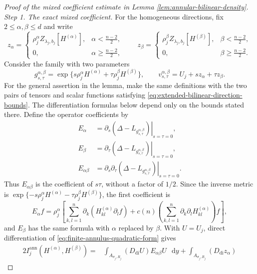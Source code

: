 \documentclass[11pt]{article}
\numberwithin{equation}{section}
\theoremstyle{remark}
\newcommand{\dd}{\mathop{}\!\mathrm{d}}
\begin{document}
\begin{proof}[Proof of the mixed coefficient estimate in
Lemma  \ref{lem:annular-bilinear-density}]
\emph{Step 1. The exact mixed coefficient.}
{For the homogeneous directions, fix
\(2\le\alpha,\beta\le d\) and write}
\[
 z_\alpha=\begin{cases}
  \rho_j^\alpha Z_{\lambda_j,b_j}[H^{(\alpha)}],
  &\alpha<\frac{n-2}{2},\\
  0,&\alpha\ge \frac{n-2}{2},
 \end{cases}
 \qquad
 z_\beta=\begin{cases}
  \rho_j^\beta Z_{\lambda_j,b_j}[H^{(\beta)}],
  &\beta<\frac{n-2}{2},\\
  0,&\beta\ge \frac{n-2}{2}.
 \end{cases}
\]
Consider the family with two parameters
\[
 g_{s,\tau}^{\alpha,\beta}
 =\exp\{s\rho_j^\alpha H^{(\alpha)}
       +\tau\rho_j^\beta H^{(\beta)}\},\qquad
 v_{s,\tau}^{\alpha,\beta}=U_j+sz_\alpha+\tau z_\beta.
\]
{For the general assertion in the lemma, make the same
definitions with the two pairs of tensors and scalar functions satisfying
\eqref{eq:extended-bilinear-direction-bounds}. The differentiation formulas
below depend only on the bounds stated there.}
Define the operator coefficients by
\[
 \begin{aligned}
 E_\alpha
 &=\left.\partial_s(\Delta-L_{g_{s,\tau}^{\alpha,\beta}})
   \right|_{s=\tau=0},\\
 E_\beta
 &=\left.\partial_\tau(\Delta-L_{g_{s,\tau}^{\alpha,\beta}})
   \right|_{s=\tau=0},\\
 E_{\alpha\beta}
 &=\left.\partial_s\partial_\tau
   (\Delta-L_{g_{s,\tau}^{\alpha,\beta}})\right|_{s=\tau=0}.
 \end{aligned}
\]
Thus \(E_{\alpha\beta}\) is the coefficient of \(s\tau\), without a factor
of \(1/2\). Since the inverse metric is
\(\exp\{-s\rho_j^\alpha H^{(\alpha)}
-\tau\rho_j^\beta H^{(\beta)}\}\), the first coefficient is
\[
 E_\alpha f=\rho_j^\alpha\left[
 \sum_{k,l=1}^n\partial_k(H^{(\alpha)}_{kl}\partial_lf)
 +c(n)\left(\sum_{k,l=1}^n
 \partial_k\partial_lH^{(\alpha)}_{kl}\right)f\right],
\]
and \(E_\beta\) has the same formula with \(\alpha\) replaced by \(\beta\).
With \(U=U_j\), direct differentiation of
\eqref{eq:finite-annulus-quadratic-form} gives
 {
\begin{equation}\label{eq:exact-mixed-coefficient}
 \begin{aligned}
 2I_j^{\mathrm{ann}}(H^{(\alpha)},H^{(\beta)})
 =&\int_{A_{\sigma_j,R_j}}(D_{\mathrm{di}}U)
 E_{\alpha\beta}U\,\dd y+\int_{A_{\sigma_j,R_j}}(D_{\mathrm{di}}z_\alpha)

\end{aligned}
\end{equation}}
\end{proof}
\end{document}
